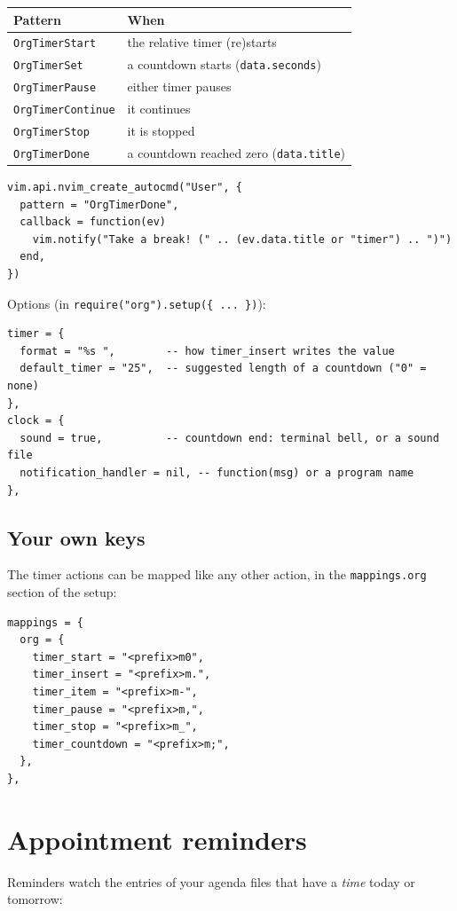\begin{center}
\begin{tabular}{ll}
Pattern & When\\
\hline
\texttt{OrgTimerStart} & the relative timer (re)starts\\
\texttt{OrgTimerSet} & a countdown starts (\texttt{data.seconds})\\
\texttt{OrgTimerPause} & either timer pauses\\
\texttt{OrgTimerContinue} & it continues\\
\texttt{OrgTimerStop} & it is stopped\\
\texttt{OrgTimerDone} & a countdown reached zero (\texttt{data.title})\\
\end{tabular}
\end{center}

\begin{verbatim}
vim.api.nvim_create_autocmd("User", {
  pattern = "OrgTimerDone",
  callback = function(ev)
    vim.notify("Take a break! (" .. (ev.data.title or "timer") .. ")")
  end,
})
\end{verbatim}

Options (in \texttt{require("org").setup(\{ ... \})}):

\begin{verbatim}
timer = {
  format = "%s ",        -- how timer_insert writes the value
  default_timer = "25",  -- suggested length of a countdown ("0" = none)
},
clock = {
  sound = true,          -- countdown end: terminal bell, or a sound file
  notification_handler = nil, -- function(msg) or a program name
},
\end{verbatim}
\subsection{Your own keys}
\label{sec:orgbdd1cd6}
The timer actions can be mapped like any other action, in the
\texttt{mappings.org} section of the setup:

\begin{verbatim}
mappings = {
  org = {
    timer_start = "<prefix>m0",
    timer_insert = "<prefix>m.",
    timer_item = "<prefix>m-",
    timer_pause = "<prefix>m,",
    timer_stop = "<prefix>m_",
    timer_countdown = "<prefix>m;",
  },
},
\end{verbatim}
\section{Appointment reminders}
\label{sec:org1709cfb}
Reminders watch the entries of your agenda files that have a \emph{time} today
or tomorrow:

